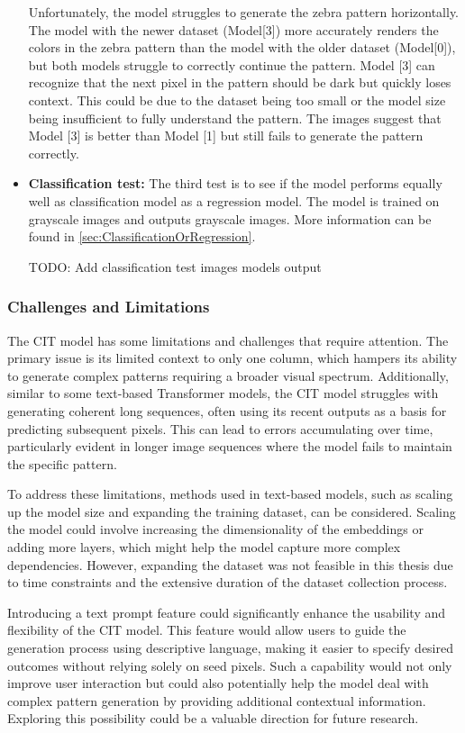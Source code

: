 \begin{itemize}
        Unfortunately, the model struggles to generate the zebra pattern horizontally. The model with the newer dataset (Model[3]) more accurately renders the colors in the zebra pattern than the model with the older dataset (Model[0]), but both models struggle to correctly continue the pattern. Model [3] can recognize that the next pixel in the pattern should be dark but quickly loses context. This could be due to the dataset being too small or the model size being insufficient to fully understand the pattern. The images suggest that Model [3] is better than Model [1] but still fails to generate the pattern correctly.


        \item \textbf{Classification test:} The third test is to see if the model performs equally well as classification model as a regression model. The model is trained on grayscale images and outputs grayscale images. More information can be found in \autoref{sec:ClassificationOrRegression}.
        
        TODO: Add classification test images models output
        

    \end{itemize}

    \subsubsection{Challenges and Limitations}

    The CIT model has some limitations and challenges that require attention. The primary issue is its limited context to only one column, which hampers its ability to generate complex patterns requiring a broader visual spectrum. Additionally, similar to some text-based Transformer models, the CIT model struggles with generating coherent long sequences, often using its recent outputs as a basis for predicting subsequent pixels. This can lead to errors accumulating over time, particularly evident in longer image sequences where the model fails to maintain the specific pattern. 

    To address these limitations, methods used in text-based models, such as scaling up the model size and expanding the training dataset, can be considered. Scaling the model could involve increasing the dimensionality of the embeddings or adding more layers, which might help the model capture more complex dependencies. However, expanding the dataset was not feasible in this thesis due to time constraints and the extensive duration of the dataset collection process.

    Introducing a text prompt feature could significantly enhance the usability and flexibility of the CIT model. This feature would allow users to guide the generation process using descriptive language, making it easier to specify desired outcomes without relying solely on seed pixels. Such a capability would not only improve user interaction but could also potentially help the model deal with complex pattern generation by providing additional contextual information. Exploring this possibility could be a valuable direction for future research.
